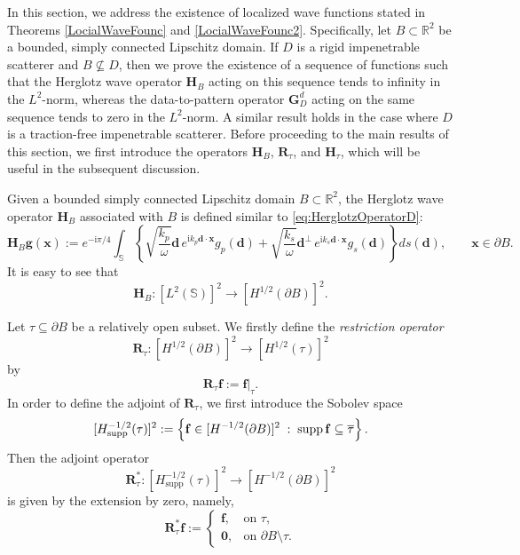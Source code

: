 \documentclass[11pt,reqno,twoside]{amsart}
\theoremstyle{definition}
\theoremstyle{remark}
\numberwithin{equation}{section}
\begin{document}
In this section, we address the existence of localized wave functions stated in Theorems \ref{LocialWaveFounc} and \ref{LocialWaveFounc2}. Specifically, let $B \subset \mathbb{R}^2$ be a bounded, simply connected Lipschitz domain. If $D$ is a rigid impenetrable scatterer and $B \not\subseteq D$, then we prove the existence of a sequence of functions such that the Herglotz wave operator $\mathbf{H}_B$ acting on this sequence tends to infinity in the $L^2$-norm, whereas the data-to-pattern operator $\mathbf{G}_D^d$ acting on the same sequence tends to zero in the $L^2$-norm. A similar result holds in the case where $D$ is a traction-free impenetrable scatterer. Before proceeding to the main results of this section, we first introduce the operators $\mathbf{H}_B$, $\mathbf{R}_{\tau}$, and $\mathbf{H}_{\tau}$, which will be useful in the subsequent discussion.

Given a bounded simply connected Lipschitz domain \(B \subset \mathbb R^2\), the Herglotz wave operator  $\mathbf{H}_B$ associated with \(B\) is defined similar to \eqref{eq:HerglotzOperatorD}:
\begin{equation}\label{eq:HerglotzOperatorB}
    \mathbf{H}_B \mathbf{g}(\mathbf{x})
    :=
    e^{-\mathrm{i}\pi/4}
    \int_{\mathbb{S}}
    \left\{
        \sqrt{\frac{k_p}{\omega}} \mathbf{d} \, e^{\mathrm{i}k_p \mathbf{d}\cdot\mathbf{x}} g_p(\mathbf{d})
        +
        \sqrt{\frac{k_s}{\omega}} \mathbf{d}^{\perp} \, e^{\mathrm{i}k_s \mathbf{d}\cdot\mathbf{x}} g_s(\mathbf{d})
    \right\}
    ds(\mathbf{d}),
    \qquad \mathbf{x} \in \partial B.
\end{equation}
It is easy to see that
$$
    \mathbf{H}_B : [L^2(\mathbb{S})]^2 \to [H^{1/2}(\partial B)]^2.
$$

Let $\tau \subseteq \partial B$ be a relatively open subset.  We firstly define the \emph{restriction operator}
$$
    \mathbf{R}_{\tau} : [H^{1/2}(\partial B)]^2 \to [H^{1/2}(\tau)]^2
$$
by
\begin{equation}\label{eq:RestrictionOperator}
    \mathbf{R}_{\tau}\mathbf{f} := \mathbf{f}|_{\tau}.
\end{equation}
In order to define the adjoint of $\mathbf{R}_{\tau}$, we first introduce the Sobolev space
\begin{equation}\notag
    [H^{-1/2}_{\mathrm{supp}}(\tau)]^2
    :=
    \left\{
        \mathbf{f} \in [H^{-1/2}(\partial B)]^2 \;:\; \operatorname{supp}\mathbf{f} \subseteq \overline{\tau}
    \right\}.
\end{equation}
Then the adjoint operator
$$
    \mathbf{R}_{\tau}^* : [H^{-1/2}_{\mathrm{supp}}(\tau)]^2 \to [H^{-1/2}(\partial B)]^2
$$
is given by the extension by zero, namely,
\begin{equation}\label{eq:RestrictionOperatorA}
    \mathbf{R}_{\tau}^* \mathbf{f}
    :=
    \begin{cases}
        \mathbf{f}, & \mbox{on } \tau,\\
        \mathbf{0}, & \mbox{on } \partial B \setminus \tau.
    \end{cases}
\end{equation}
\end{document}
